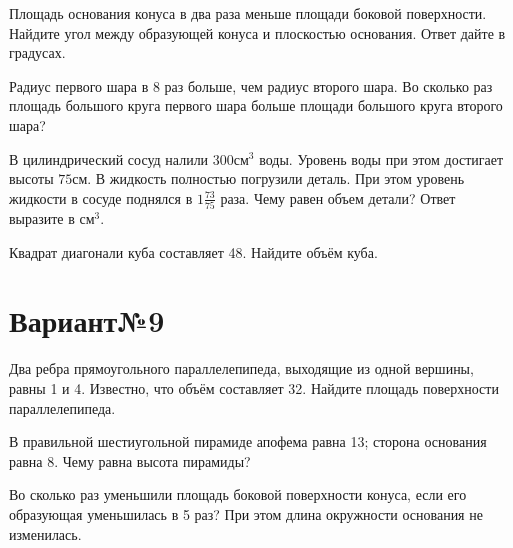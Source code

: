 \documentclass[4apaper]{article}
\begin{document}
\begin{taskBN}{3}
Площадь основания конуса в два раза меньше площади боковой поверхности. Найдите угол между образующей конуса и плоскостью основания. Ответ дайте в градусах.
\end{taskBN}

\begin{taskBN}{4}
Радиус первого шара в 8 раз больше, чем радиус второго шара. Во сколько раз площадь большого круга первого шара больше площади большого круга второго шара?
\end{taskBN}

\begin{taskBN}{5}
В цилиндрический сосуд налили $300\mbox{см}^3$ воды. Уровень воды при этом достигает высоты $75$см. В жидкость полностью погрузили деталь. При этом уровень жидкости в сосуде поднялся в ${1}\frac{73}{75}$ раза. Чему равен объем детали? Ответ выразите в $\mbox{см}^3$.
\end{taskBN}

\begin{taskBN}{6}
Квадрат диагонали куба составляет 48. Найдите объём куба.
\end{taskBN}
\newpage\section*{Вариант№9}

\begin{taskBN}{1}
Два ребра прямоугольного параллелепипеда, выходящие из одной вершины, равны 1 и 4. Известно, что объём составляет 32. Найдите площадь поверхности параллелепипеда.
\end{taskBN}

\begin{taskBN}{2}
В правильной шестиугольной пирамиде апофема равна 13; сторона основания равна 8. Чему равна высота пирамиды?
\end{taskBN}

\begin{taskBN}{3}
Во сколько раз уменьшили площадь боковой поверхности конуса, если его образующая уменьшилась в 5 раз? При этом длина окружности основания не изменилась.
\end{taskBN}
\end{document}
